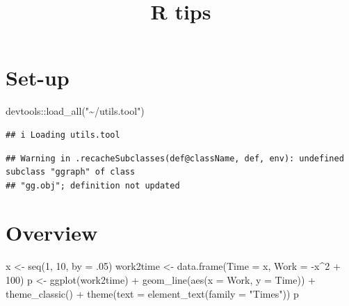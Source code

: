 \documentclass[
]{article}
\title{R tips}
\author{}
\date{\vspace{-2.5em}}
\newenvironment{Shaded}{\begin{snugshade}}{\end{snugshade}}
\newcommand{\AttributeTok}[1]{\textcolor[rgb]{0.77,0.63,0.00}{#1}}
\newcommand{\CommentTok}[1]{\textcolor[rgb]{0.56,0.35,0.01}{\textit{#1}}}
\newcommand{\DecValTok}[1]{\textcolor[rgb]{0.00,0.00,0.81}{#1}}
\newcommand{\FunctionTok}[1]{\textcolor[rgb]{0.00,0.00,0.00}{#1}}
\newcommand{\NormalTok}[1]{#1}
\newcommand{\OtherTok}[1]{\textcolor[rgb]{0.56,0.35,0.01}{#1}}
\newcommand{\SpecialCharTok}[1]{\textcolor[rgb]{0.00,0.00,0.00}{#1}}
\newcommand{\StringTok}[1]{\textcolor[rgb]{0.31,0.60,0.02}{#1}}
\begin{document}
\maketitle

{
\setcounter{tocdepth}{3}
\tableofcontents
}
\hypertarget{set-up}{%
\section{Set-up}\label{set-up}}

\begin{Shaded}
\begin{Highlighting}[]
\NormalTok{devtools}\SpecialCharTok{::}\FunctionTok{load\_all}\NormalTok{(}\StringTok{"\textasciitilde{}/utils.tool"}\NormalTok{)}
\end{Highlighting}
\end{Shaded}

\begin{verbatim}
## i Loading utils.tool
\end{verbatim}

\begin{verbatim}
## Warning in .recacheSubclasses(def@className, def, env): undefined subclass "ggraph" of class
## "gg.obj"; definition not updated
\end{verbatim}

\begin{Shaded}
\end{Shaded}

\hypertarget{overview}{%
\section{Overview}\label{overview}}

\begin{Shaded}
\begin{Highlighting}[]
\NormalTok{x }\OtherTok{\textless{}{-}} \FunctionTok{seq}\NormalTok{(}\DecValTok{1}\NormalTok{, }\DecValTok{10}\NormalTok{, }\AttributeTok{by =}\NormalTok{ .}\DecValTok{05}\NormalTok{)}
\NormalTok{work2time }\OtherTok{\textless{}{-}} \FunctionTok{data.frame}\NormalTok{(}\AttributeTok{Time =}\NormalTok{ x, }\AttributeTok{Work =} \SpecialCharTok{{-}}\NormalTok{x}\SpecialCharTok{\^{}}\DecValTok{2} \SpecialCharTok{+} \DecValTok{100}\NormalTok{)}
\NormalTok{p }\OtherTok{\textless{}{-}} \FunctionTok{ggplot}\NormalTok{(work2time) }\SpecialCharTok{+}
  \FunctionTok{geom\_line}\NormalTok{(}\FunctionTok{aes}\NormalTok{(}\AttributeTok{x =}\NormalTok{ Work, }\AttributeTok{y =}\NormalTok{ Time)) }\SpecialCharTok{+}
  \FunctionTok{theme\_classic}\NormalTok{() }\SpecialCharTok{+}
  \FunctionTok{theme}\NormalTok{(}\AttributeTok{text =} \FunctionTok{element\_text}\NormalTok{(}\AttributeTok{family =} \StringTok{"Times"}\NormalTok{))}
\NormalTok{p}
\end{Highlighting}
\end{Shaded}
\end{document}
